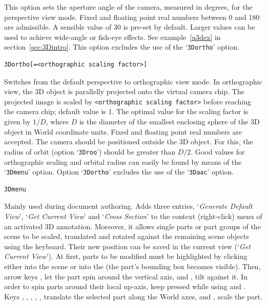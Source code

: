 \documentclass[a4paper]{article}
\begin{document}
This option sets the aperture angle of the camera, measured in degrees, for the perspective view mode. Fixed and floating point real numbers between 0 and 180 are admissible. A sensible value of 30 is pre-set by default. Larger values can be used to achieve wide-angle or fish-eye effects. See example~\ref{u3dex} in section~\ref{sec:3Dintro}. This option excludes the use of the `\verb+3Dortho+' option.
\begin{verbatim}
3Dortho[=<orthographic scaling factor>]
\end{verbatim}
Switches from the default perspective to orthographic view mode. In orthographic view, the 3D object is parallelly projected onto the virtual camera chip. The projected image is scaled by \verb+<orthographic scaling factor>+ before reaching the camera chip; default value is 1. The optimal value for the scaling factor is given by $1/D$, where $D$ is the diameter of the smallest enclosing sphere of the 3D object in World coordinate units. Fixed and floating point real numbers are accepted. The camera should be positioned outside the 3D object. For this, the radius of orbit (option `\verb+3Droo+') should be greater than $D/2$. Good values for orthographic scaling and orbital radius can easily be found by means of the `\verb+3Dmenu+' option. Option `\verb+3Dortho+' excludes the use of the `\verb+3Daac+' option.
\hypertarget{3dmenu}{}%
\begin{verbatim}
3Dmenu
\end{verbatim}
Mainly used during document authoring. Adds three entries, `\emph{\sffamily Generate Default View}', `\emph{\sffamily Get Current View}' and `\emph{\sffamily Cross Section}' to the context (right-click) menu of an activated 3D annotation. Moreover, it allows single parts or part groups of the scene to be scaled, translated and rotated against the remaining scene objects using the keyboard. Their new position can be saved in the current view (`\emph{\sffamily Get Current View}'). At first, parts to be modified must be highlighted by clicking either into the scene or into the  (the part's bounding box becomes visible). Then, arrow keys \keys{\arrowkeyleft}, \keys{\arrowkeyright} let the part spin around the vertical axis, and \keys{\arrowkeyup}, \keys{\arrowkeydown} tilt against it. In order to spin parts around their local up-axis, keep \keys{\ctrl} pressed while using \keys{\arrowkeyleft} and \keys{\arrowkeyright}. Keys , , , , ,  translate the selected part along the World axes, and ,  scale the part.
\end{document}

